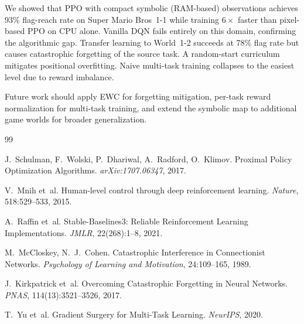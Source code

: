 \documentclass[10pt,a4paper,twocolumn]{article}
\begin{document}
We showed that PPO with compact symbolic (RAM-based) observations achieves
93\% flag-reach rate on Super Mario Bros~1-1 while training $6\!\times$
faster than pixel-based PPO on CPU alone.
Vanilla DQN fails entirely on this domain, confirming the algorithmic gap.
Transfer learning to World~1-2 succeeds at 78\% flag rate but causes
catastrophic forgetting of the source task.
A random-start curriculum mitigates positional overfitting.
Naive multi-task training collapses to the easiest level due to reward
imbalance.

Future work should apply EWC for forgetting mitigation, per-task reward
normalization for multi-task training, and extend the symbolic map to
additional game worlds for broader generalization.



\begin{thebibliography}{99}

J.~Schulman, F.~Wolski, P.~Dhariwal, A.~Radford, O.~Klimov.
\newblock Proximal Policy Optimization Algorithms.
\newblock \textit{arXiv:1707.06347}, 2017.

V.~Mnih et~al.
\newblock Human-level control through deep reinforcement learning.
\newblock \textit{Nature}, 518:529--533, 2015.

A.~Raffin et~al.
\newblock Stable-Baselines3: Reliable Reinforcement Learning Implementations.
\newblock \textit{JMLR}, 22(268):1--8, 2021.

M.~McCloskey, N.~J.~Cohen.
\newblock Catastrophic Interference in Connectionist Networks.
\newblock \textit{Psychology of Learning and Motivation}, 24:109--165, 1989.

J.~Kirkpatrick et~al.
\newblock Overcoming Catastrophic Forgetting in Neural Networks.
\newblock \textit{PNAS}, 114(13):3521--3526, 2017.

T.~Yu et~al.
\newblock Gradient Surgery for Multi-Task Learning.
\newblock \textit{NeurIPS}, 2020.

\end{thebibliography}
\end{document}
